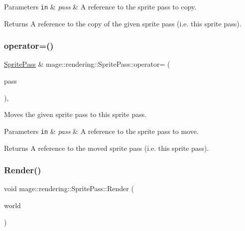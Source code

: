 \begin{DoxyParams}[1]{Parameters}
\mbox{\tt in}  & {\em pass} & A reference to the sprite pass to copy. \\
\hline
\end{DoxyParams}
\begin{DoxyReturn}{Returns}
A reference to the copy of the given sprite pass (i.\+e. this sprite pass). 
\end{DoxyReturn}
\mbox{\label{classmage_1_1rendering_1_1_sprite_pass_a17566d8f281862629f095211bad18b9e}} 
\subsubsection{\texorpdfstring{operator=()}{operator=()}\hspace{0.1cm}{\footnotesize\ttfamily [2/2]}}
{\footnotesize\ttfamily \mbox{\hyperlink{classmage_1_1rendering_1_1_sprite_pass}{Sprite\+Pass}} \& mage\+::rendering\+::\+Sprite\+Pass\+::operator= (\begin{DoxyParamCaption}\item[{\mbox{\hyperlink{classmage_1_1rendering_1_1_sprite_pass}{Sprite\+Pass}} \&\&}]{pass }\end{DoxyParamCaption})\hspace{0.3cm}{\ttfamily [default]}, {\ttfamily [noexcept]}}

Moves the given sprite pass to this sprite pass.


\begin{DoxyParams}[1]{Parameters}
\mbox{\tt in}  & {\em pass} & A reference to the sprite pass to move. \\
\hline
\end{DoxyParams}
\begin{DoxyReturn}{Returns}
A reference to the moved sprite pass (i.\+e. this sprite pass). 
\end{DoxyReturn}
\mbox{\label{classmage_1_1rendering_1_1_sprite_pass_a9b4dbd8c8d0a8942976b6d0c0df7aa3d}} 
\subsubsection{\texorpdfstring{Render()}{Render()}}
{\footnotesize\ttfamily void mage\+::rendering\+::\+Sprite\+Pass\+::\+Render (\begin{DoxyParamCaption}\item[{const \mbox{\hyperlink{classmage_1_1rendering_1_1_world}{World}} \&}]{world }\end{DoxyParamCaption})}

